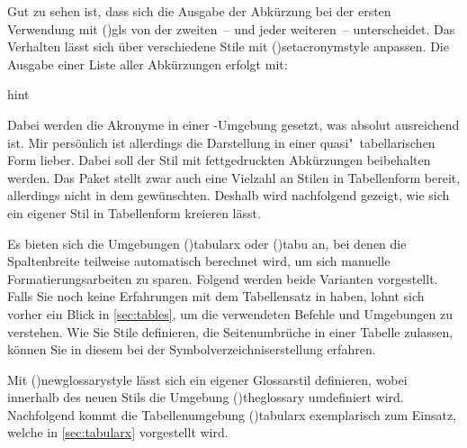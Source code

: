 \documentclass[%
  english,ngerman,%
  cdgeometry=no,DIV=12,%
  cd=false,cdfont=false,cdtitle=true,%
  headings=normal,%
  automark,%
  listof=toc,%
]{tudscrartcl}
\begin{document}
Gut zu sehen ist, dass sich die Ausgabe der Abkürzung bei der ersten Verwendung 
mit \Macro(){gls} von der zweiten~-- und jeder weiteren~-- 
unterscheidet. Das Verhalten lässt sich über verschiedene Stile mit 
\Macro(){setacronymstyle} anpassen. Die Ausgabe einer Liste 
aller Abkürzungen erfolgt mit:
%
\begin{Code}{hint}
\printacronyms
\end{Code}
\begin{quoting}[rightmargin=0pt]
\glsdisablehyper
\printacronyms[style=simple]
\end{quoting}

Dabei werden die Akronyme in einer -Umgebung gesetzt,
was absolut ausreichend ist. Mir persönlich ist allerdings die Darstellung in 
einer quasi"~tabellarischen Form lieber. Dabei soll der Stil mit fettgedruckten 
Abkürzungen beibehalten werden. Das Paket  stellt zwar 
auch eine Vielzahl an Stilen in Tabellenform bereit, allerdings nicht in dem 
gewünschten. Deshalb wird nachfolgend gezeigt, wie sich ein eigener Stil in 
Tabellenform kreieren lässt.

Es bieten sich die Umgebungen \Environment(){tabularx} oder 
\Environment(){tabu} an, bei denen die Spaltenbreite teilweise 
automatisch berechnet wird, um sich manuelle Formatierungsarbeiten zu sparen. 
Folgend werden beide Varianten vorgestellt. Falls Sie noch keine Erfahrungen 
mit dem Tabellensatz in  haben, lohnt sich vorher ein Blick in 
\autoref{sec:tables}, um die verwendeten Befehle und Umgebungen zu verstehen. 
Wie Sie Stile definieren, die Seitenumbrüche in einer Tabelle zulassen, können 
Sie in diesem  bei der Symbolverzeichniserstellung 
erfahren.



Mit \Macro(){newglossarystyle} lässt sich ein eigener 
Glossarstil definieren, wobei innerhalb des neuen Stils die Umgebung 
\Environment(){theglossary} umdefiniert wird. Nachfolgend 
kommt die Tabellenumgebung \Environment(){tabularx} 
exemplarisch zum Einsatz, welche in \autoref{sec:tabularx} vorgestellt wird.
\end{document}
